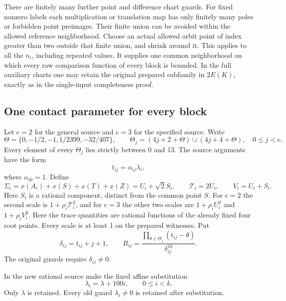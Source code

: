 \documentclass[11pt]{article}
\begin{document}
There are finitely many further point and difference chart guards.
For fixed nonzero labels each multiplication or translation map
has only finitely many poles or forbidden point preimages.  Their
finite union can be avoided within the allowed reference
neighborhood.  Choose an actual allowed orbit point of index greater
than two outside that finite union, and shrink around it.  This
applies to all the $n_i$, including repeated values.  It supplies
one common neighborhood on which every raw
comparison function of every block is bounded.  In the full
auxiliary charts one may retain the original prepared subfamily in
$2E(K)$, exactly as in the single-input completeness proof.

\subsection{One contact parameter for every block}

Let $e=2$ for the general source and $e=3$ for the specified source.
Write
\[
 \Theta=\{0,-1/2,-1,1/2399,-32/407\},\qquad
 \Theta_j=(4j+2+\Theta)\cup(4j+4+\Theta),\quad 0\le j<e.
\]
Every element of every $\Theta_j$ lies strictly between 0 and 13.
The source arguments have the form
\[
                         t_{ij}=\alpha_{ij}\lambda_i,
\]
where $\alpha_{i0}=1$. Define
\[
 \Sigma_i=x(A_i)+x(S)+x(T)+x(Z)=U_i+\sqrt2 S_i,\qquad
 \mathcal T_i=2U_i,\qquad V_i=U_i+S_i.
\]
Here $S_i$ is a rational component, distinct from the common point $S$.
For $e=2$ the second scale is
$1+\rho_i\mathcal T_i^2$, and for $e=3$ the other two scales are
$1+\rho_i U_i^2$ and $1+\rho_i V_i^2$.  Here the trace quantities
are rational functions of the already fixed four root points.
Every scale is at least 1 on the prepared witnesses. Put
\[
 \delta_{ij}=t_{ij}+j+1,\qquad
 R_{ij}=\frac{\prod_{\theta\in\Theta_j}(t_{ij}-\theta)}{\delta_{ij}^{10}}.
\]
The original guards require $\delta_{ij}\ne0$.

In the new rational source make the fixed affine substitution
\begin{equation}\label{eq:joint-affine-contact}
                       \lambda_i=\lambda+100i,
                       \qquad 0\le i<k.
\end{equation}
Only $\lambda$ is retained.  Every old guard $\lambda_i\ne0$
is retained after substitution.
\end{document}
